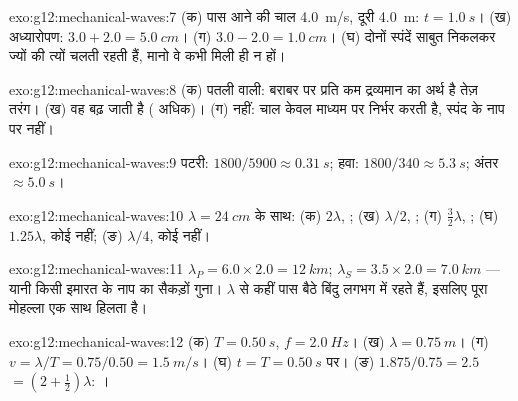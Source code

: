 \begin{solution}{exo:g12:mechanical-waves:7}
(क) पास आने की चाल \qty{4.0}{m/s}, दूरी \qty{4.0}{m}: $t = \qty{1.0}{s}$। (ख) अध्यारोपण: $3.0 + 2.0 = \qty{5.0}{cm}$।
(ग) $3.0 - 2.0 = \qty{1.0}{cm}$। (घ) दोनों स्पंदें साबुत निकलकर ज्यों की त्यों चलती रहती हैं,
मानो वे कभी मिली ही न हों।
\end{solution}

\begin{solution}{exo:g12:mechanical-waves:8}
(क) पतली वाली: बराबर  पर प्रति  कम द्रव्यमान
का अर्थ है तेज़ तरंग। (ख) वह बढ़ जाती है ( अधिक)।
(ग) नहीं: चाल केवल माध्यम पर निर्भर करती है, स्पंद के नाप पर नहीं।
\end{solution}

\begin{solution}{exo:g12:mechanical-waves:9}
पटरी: $1800/5900 \approx \qty{0.31}{s}$; हवा: $1800/340 \approx \qty{5.3}{s}$; अंतर $\approx \qty{5.0}{s}$।
\end{solution}

\begin{solution}{exo:g12:mechanical-waves:10}
$\lambda = \qty{24}{cm}$ के साथ: (क) $2\lambda$, ; (ख) $\lambda/2$, ;
(ग) $\tfrac32\lambda$, ; (घ) $1.25\lambda$, कोई नहीं; (ङ) $\lambda/4$, कोई नहीं।
\end{solution}

\begin{solution}{exo:g12:mechanical-waves:11}
$\lambda_P = 6.0 \times 2.0 = \qty{12}{km}$; $\lambda_S = 3.5 \times 2.0 = \qty{7.0}{km}$ --- यानी किसी इमारत के नाप का सैकड़ों गुना। $\lambda$ से कहीं
पास बैठे बिंदु लगभग  में रहते हैं, इसलिए पूरा मोहल्ला एक साथ
हिलता है।
\end{solution}

\begin{solution}{exo:g12:mechanical-waves:12}
(क) $T = \qty{0.50}{s}$, $f = \qty{2.0}{Hz}$। (ख) $\lambda = \qty{0.75}{m}$। (ग) $v = \lambda/T = 0.75/0.50 = \qty{1.5}{m/s}$। (घ) $t = T = \qty{0.50}{s}$ पर। (ङ) $1.875/0.75 = 2.5$
 $= (2 + \tfrac12)\lambda$: ।
\end{solution}

